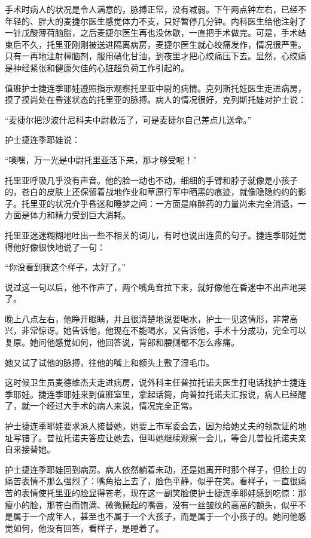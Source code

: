 手术时病人的状况是令人满意的，脉搏正常，没有减弱。下午两点钟左右，已经不年轻的、胖大的麦捷尔医生感觉体力不支，只好暂停几分钟。内科医生给他注射了一针戊酸薄荷脑脂，之后麦捷尔医生再也没休歇，一直把手术做完。可是，手术结束后不久，托里亚刚刚被送进隔离病房，麦捷尔医生就心绞痛发作，情况很严重。只有一再地注射樟脑剂，服用硝化甘油，到夜里才把心绞痛压下去。显然，心绞痛是神经紧张和健康欠佳的心脏超负荷工作引起的。

值班护士捷连季耶娃遵照指示观察托里亚中尉的病情。克列斯托娃医生走进病房，摸了摸尚处在昏迷状态的托里亚的脉搏。病人的情况很好，克列斯托娃对护士说：

“麦捷尔把沙波什尼科夫中尉救活了，可是麦捷尔自己差点儿送命。”

护士捷连季耶娃说：

“噢嘿，万一光是中尉托里亚活下来，那才够受呢！”

托里亚呼吸几乎没有声音。他的脸一动也不动，细细的手臂和脖子就像是小孩子的，苍白的皮肤上还保留着战地作业和草原行军中晒黑的痕迹，就像隐隐约约的影子。托里亚的状况介乎昏迷和睡梦之间：一方面是麻醉药的力量尚未完全消退，一方面是体力和精力受到巨大消耗。

托里亚迷迷糊糊地吐出一些不相关的词儿，有时也说出连贯的句子。捷连季耶娃觉得他好像很快地说了一句：

“你没看到我这个样子，太好了。”

说过这一句以后，他不作声了，两个嘴角耷拉下来，就好像他在昏迷中不出声地哭了。

晚上八点左右，他睁开眼睛，并且很清楚地说要喝水，护士一见这情形，非常高兴，非常惊讶。她告诉他，他现在不能喝水，又告诉他，手术十分成功，完全可以复原。她问他感觉如何，他回答说，背部和腰侧都不怎么疼痛。

她又试了试他的脉搏，往他的嘴上和额头上敷了湿毛巾。

这时候卫生员麦德维杰夫走进病房，说外科主任普拉托诺夫医生打电话找护士捷连季耶娃。捷连季耶娃来到值班室里，拿起话筒，向普拉托诺夫汇报说，病人已经醒了，就一个经过大手术的病人来说，情况完全正常。

护士捷连季耶娃要求派人接替她，她要上市军委会去，因为给她丈夫的领款证的地址写错了。普拉托诺夫答应让她去，但叫她继续观察一会儿，等会儿普拉托诺夫亲自来接替她。

护士捷连季耶娃回到病房。病人依然躺着未动，还是她离开时那个样子，但脸上的痛苦表情不那么强烈了：嘴角抬上去了，脸色平静，似乎在笑。看样子，一直很痛苦的表情使托里亚的脸显得苍老，现在这一副笑脸使护士捷连季耶娃感到吃惊：那瘦小的脸，那苍白而饱满、微微撅起的嘴唇，没有一丝皱纹的高高的额头，似乎不是属于一个成年人，甚至也不属于一个大孩子，而是属于一个小孩子的。她问他感觉如何，他没有回答，看样子，是睡着了。

